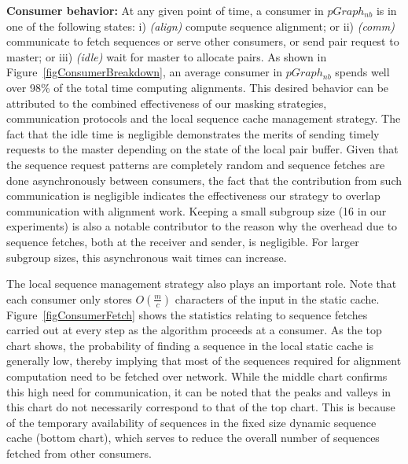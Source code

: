 \documentclass[10pt,journal,letterpaper,compsoc]{IEEEtran}
\begin{document}
{\bf Consumer behavior: } At any given point of time, a consumer in $pGraph_{nb}$ is in one of the following states: i) \emph{(align)} compute sequence alignment; or ii) \emph{(comm)} communicate to fetch sequences or serve other consumers, or send pair request to master; or iii) \emph{(idle)} wait for master to allocate pairs. As shown in Figure~\ref{figConsumerBreakdown}, an average consumer in $pGraph_{nb}$ spends well over 98\% of the total time computing alignments. This desired behavior can be attributed to the combined effectiveness of our masking strategies, communication protocols and the local sequence cache management strategy. The fact that the idle time is negligible demonstrates the merits of sending timely requests to the master depending on the state of the local pair buffer. Given that the sequence request patterns are completely random and sequence fetches are done asynchronously between consumers, the fact that the contribution from such communication is negligible indicates the effectiveness our strategy to overlap communication with alignment work. Keeping a small subgroup size (16 in our experiments) is also a notable contributor to the reason why the overhead due to sequence fetches, both at the receiver and sender, is negligible. For larger subgroup sizes, this asynchronous wait times can increase.

The local sequence management strategy also plays an important role. Note that each consumer only stores $O(\frac{m}{c})$ characters of the input in the static cache. Figure~\ref{figConsumerFetch} shows the statistics relating to sequence fetches carried out at every step as the algorithm proceeds at a consumer. As the top chart shows, the probability of finding a sequence in the local static cache is generally low, thereby implying that most of the sequences required for alignment computation need to be fetched over network. While the middle chart confirms this high need for communication, it can be noted that the peaks and valleys in this chart do not necessarily correspond to that of the top chart. This is because of the temporary availability of sequences in the fixed size dynamic sequence cache (bottom chart), which serves to reduce the overall number of sequences fetched from other consumers.
 
\end{document}
